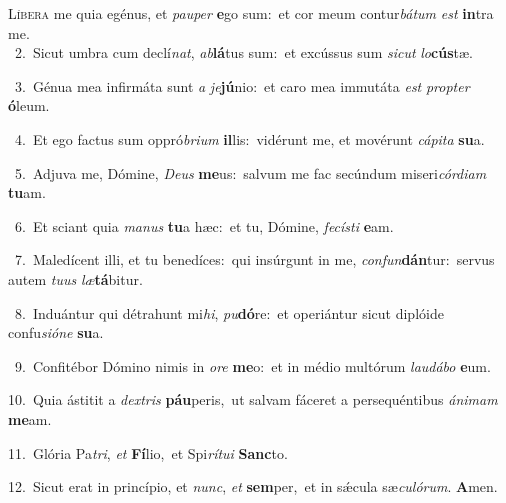 \lettrine{\initial\textcolor{\initialcolor}{L}}{íbera} me quia egénus, et \textit{pau}\-\textit{per} \textbf{e}\-go sum:~\star et cor meum contur\-\textit{bá}\-\textit{tum} \textit{est} \textbf{in}\-tra me.\\
{\numbfont\textcolor{\numbcolor}{~2.}}~Sicut umbra cum declí\-\textit{nat}\-, \textit{ab}\-\textbf{lá}tus sum:~\star et excússus sum \textit{sic}\-\textit{ut} \textit{lo}\-\textbf{cús}tæ.\par
{\numbfont\textcolor{\numbcolor}{~3.}}~Génua mea infirmáta sunt \textit{a} \textit{je}\-\textbf{jú}nio:~\star et caro mea immutáta \textit{est} \textit{prop}\-\textit{ter} \textbf{ó}\-leum.\par
{\numbfont\textcolor{\numbcolor}{~4.}}~Et ego factus sum oppró\-\textit{bri}\-\textit{um} \textbf{il}\-lis:~\star vidérunt me, et movérunt \textit{cá}\-\textit{pi}\textit{ta} \textbf{su}\-a.\par
{\numbfont\textcolor{\numbcolor}{~5.}}~Adjuva me, Dómine, \textit{De}\-\textit{us} \textbf{me}\-us:~\star salvum me fac secúndum miseri\-\textit{cór}\-\textit{di}\textit{am} \textbf{tu}\-am.\par
{\numbfont\textcolor{\numbcolor}{~6.}}~Et sciant quia \textit{ma}\-\textit{nus} \textbf{tu}\-a hæc:~\star et tu, Dómine, \textit{fe}\-\textit{cís}\textit{ti} \textbf{e}\-am.\par
{\numbfont\textcolor{\numbcolor}{~7.}}~Maledícent illi, et tu benedíces:~\dagger qui insúrgunt in me, \textit{con}\-\textit{fun}\textbf{dán}tur:~\star servus autem \textit{tu}\-\textit{us} \textit{læ}\-\textbf{tá}bitur.\par
{\numbfont\textcolor{\numbcolor}{~8.}}~Induántur qui détrahunt mi\-\textit{hi}\-, \textit{pu}\-\textbf{dó}re:~\star et operiántur sicut diplóide confu\-\textit{si}\-\textit{ó}\textit{ne} \textbf{su}\-a.\par
{\numbfont\textcolor{\numbcolor}{~9.}}~Confitébor Dómino nimis in \textit{o}\-\textit{re} \textbf{me}\-o:~\star et in médio multórum \textit{lau}\-\textit{dá}\textit{bo} \textbf{e}\-um.\par
{\numbfont\textcolor{\numbcolor}{10.}}~Quia ástitit a \textit{dex}\-\textit{tris} \textbf{páu}\-peris,~\star ut salvam fáceret a persequéntibus \textit{á}\-\textit{ni}\textit{mam} \textbf{me}\-am.\par
{\numbfont\textcolor{\numbcolor}{11.}}~Glória Pa\-\textit{tri}\-, \textit{et} \textbf{Fí}\-lio,~\star et Spi\-\textit{rí}\-\textit{tu}\textit{i} \textbf{Sanc}\-to.\par
{\numbfont\textcolor{\numbcolor}{12.}}~Sicut erat in princípio, et \textit{nunc}\-, \textit{et} \textbf{sem}\-per,~\star et in sǽcula sæ\-\textit{cu}\-\textit{ló}\textit{rum}. \textbf{A}\-men.\par
